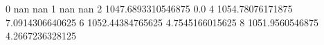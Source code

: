 0 nan nan
1 nan nan
2 1047.6893310546875 0.0
4 1054.78076171875 7.0914306640625
6 1052.44384765625 4.7545166015625
8 1051.9560546875 4.2667236328125
